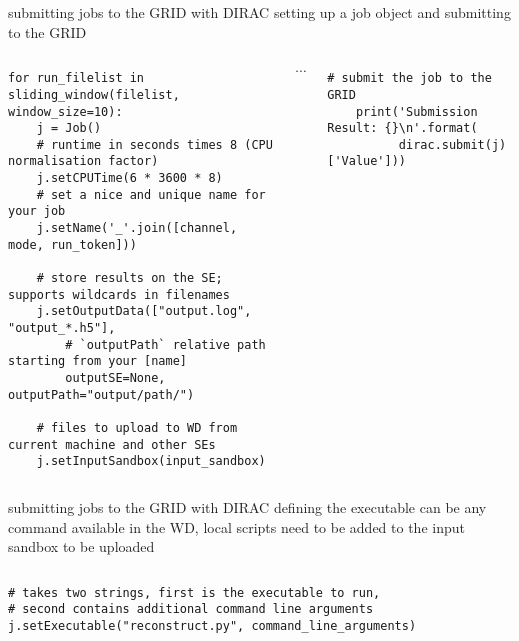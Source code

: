 \documentclass{beamer}
\begin{document}
\begin{frame}[fragile]{submitting jobs to the GRID with DIRAC}
             {setting up a job object and submitting to the GRID}
    \begin{columns}
        \begin{lstlisting}[basicstyle=\scriptsize,firstnumber=24]
for run_filelist in sliding_window(filelist, window_size=10):
    j = Job()
    # runtime in seconds times 8 (CPU normalisation factor)
    j.setCPUTime(6 * 3600 * 8)
    # set a nice and unique name for your job
    j.setName('_'.join([channel, mode, run_token]))

    # store results on the SE; supports wildcards in filenames
    j.setOutputData(["output.log", "output_*.h5"],
        # `outputPath` relative path starting from your [name]
        outputSE=None, outputPath="output/path/")

    # files to upload to WD from current machine and other SEs
    j.setInputSandbox(input_sandbox)
        \end{lstlisting}

        \hspace{20pt}$\cdots$

        \begin{lstlisting}[basicstyle=\scriptsize,firstnumber=54]
    # submit the job to the GRID
    print('Submission Result: {}\n'.format(
          dirac.submit(j)['Value']))
        \end{lstlisting}
    \end{columns}
\end{frame}


\begin{frame}[fragile]{submitting jobs to the GRID with DIRAC}
                      {defining the executable}
    can be any command available in the WD, local scripts need to be added to the
    input sandbox to be uploaded
    \begin{columns}
        \begin{lstlisting}[basicstyle=\scriptsize,firstnumber=38]
# takes two strings, first is the executable to run,
# second contains additional command line arguments
j.setExecutable("reconstruct.py", command_line_arguments)
        \end{lstlisting}
    \end{columns}
\end{frame}
\end{document}

